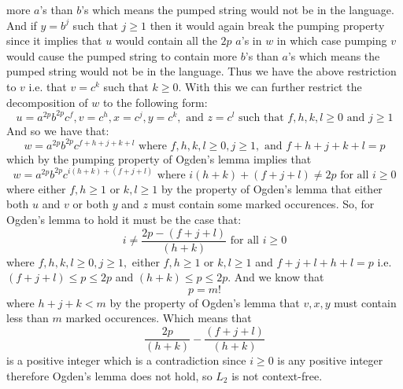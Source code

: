 \documentclass[12pt]{article}
\begin{document}
more $a$'s than $b$'s which means the pumped string would not be in the language.
And if $y=b^j$ such that $j\ge 1$ then it would again break the pumping property
since it implies that $u$ would contain all the $2p$ $a$'s in $w$ in which case
pumping $v$ would cause the pumped string to contain more $b$'s than $a$'s which
means the pumped string would not be in the language. Thus we have the above
restriction to $v$ i.e. that $v=c^k$ such that $k\ge 0$. With this we can
further restrict the decomposition of $w$ to the following form:
$$u=a^{2p}b^{2p}c^f, v=c^h, x=c^j, y=c^k,\text{ and } z=c^l
\text{ such that } f,h,k,l\ge 0 \text{ and } j\ge1$$
And so we have that:
$$w = a^{2p}b^{2p}c^{f+h+j+k+l} \text{ where } f,h,k,l\ge 0, j\ge 1,
\text{ and } f+h+j+k+l=p$$
which by the pumping property of Ogden's lemma implies that
$$w = a^{2p}b^{2p}c^{i(h+k) + (f+j+l)} \text { where } i(h+k)+(f+j+l)\neq 2p
\text{ for all } i\ge 0$$
where either $f,h\ge 1$ or $k,l\ge 1$ by the property of Ogden's lemma that
either both $u$ and $v$ or both $y$ and $z$ must contain some marked occurences.
So, for Ogden's lemma to hold it must be the case that:
$$i \neq \frac{2p-(f+j+l)}{(h+k)} \text{ for all } i\ge 0$$
where $f,h,k,l \ge 0, j\ge 1,$ either $f,h\ge 1$ or $k,l\ge 1$ and
$f+j+l+h+l = p$ i.e. $(f+j+l) \le p \le 2p$ and $(h+k) \le p \le 2p$. And we
know that
$$p = m!$$
where $h+j+k < m$ by the property of Ogden's lemma that $v,x,y$ must contain
less than $m$ marked occurences. Which means that
$$\frac{2p}{(h+k)}-\frac{(f+j+l)}{(h+k)}$$
is a positive integer which is a contradiction since $i\ge 0$ is any positive
integer therefore Ogden's lemma does not hold, so $L_2$ is not context-free.
\end{document}
